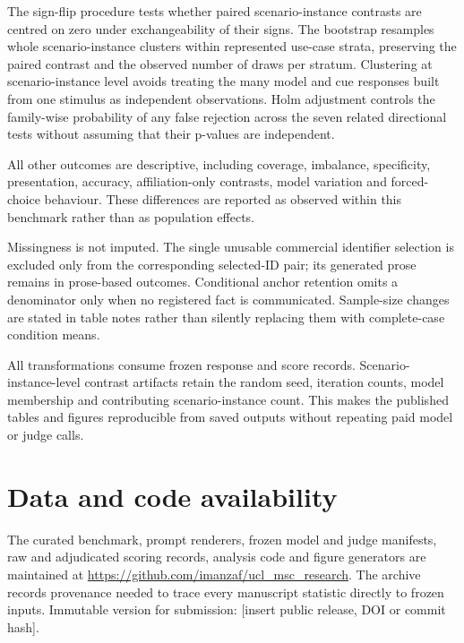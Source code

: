 \documentclass[12pt,a4paper,oneside]{report}
\newcommand{\rev}[1]{#1}
\newenvironment{revisionblock}{}{}
\begin{document}
\begin{revisionblock}
The sign-flip procedure tests whether paired scenario-instance contrasts are centred on zero under exchangeability of their signs. The bootstrap resamples whole scenario-instance clusters within represented use-case strata, preserving the paired contrast and the observed number of draws per stratum. Clustering at scenario-instance level avoids treating the many model and cue responses built from one stimulus as independent observations. Holm adjustment controls the family-wise probability of any false rejection across the seven related directional tests without assuming that their p-values are independent.

All other outcomes are descriptive, including coverage, imbalance, specificity, presentation, accuracy, affiliation-only contrasts, model variation and forced-choice behaviour. These differences are reported as observed within this benchmark rather than as population effects.

Missingness is not imputed. The single unusable commercial identifier selection is excluded only from the corresponding selected-ID pair; its generated prose remains in prose-based outcomes. Conditional anchor retention omits a denominator only when no registered fact is communicated. Sample-size changes are stated in table notes rather than silently replacing them with complete-case condition means.

All transformations consume frozen response and score records. Scenario-instance-level contrast artifacts retain the random seed, iteration counts, model membership and contributing scenario-instance count. This makes the published tables and figures reproducible from saved outputs without repeating paid model or judge calls.
\end{revisionblock}

\section[Data and code availability]{\rev{Data and code availability}}

\begin{revisionblock}
The curated benchmark, prompt renderers, frozen model and judge manifests, raw and adjudicated scoring records, analysis code and figure generators are maintained at \url{https://github.com/imanzaf/ucl_msc_research}. The archive records provenance needed to trace every manuscript statistic directly to frozen inputs. Immutable version for submission: \rev{[insert public release, DOI or commit hash]}.
\end{revisionblock}
\end{document}
